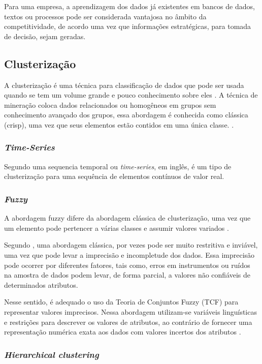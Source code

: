 \documentclass[conference,compsoc]{IEEEtran}
\begin{document}
Para uma empresa, a aprendizagem dos dados já existentes em bancos de dados, textos ou processos pode ser considerada vantajosa no âmbito da competitividade, de acordo \citet{thuraisingham_data_1998} uma vez que informações estratégicas, para tomada de decisão, sejam geradas.

\subsection{Clusterização}
A clusterização é uma técnica para classificação de dados que pode ser usada quando se tem um volume grande e pouco conhecimento sobre eles \cite{reviewcluster}. A técnica de mineração coloca dados relacionados ou homogêneos em grupos sem conhecimento avançado dos grupos, essa abordagem é conhecida como clássica (crisp), uma vez que seus elementos estão contidos em uma única classe. \cite{Rai2010cluster}.

\subsubsection{\textit{Time-Series}}
Segundo \citet{Antunes2001TemporalDM} uma sequencia temporal ou \textit{time-series}, em inglês, é um tipo de clusterização para uma sequência de elementos contínuos de valor real.

\subsubsection{\textit{Fuzzy}}
A abordagem fuzzy difere da abordagem clássica de clusterização, uma vez que um elemento pode pertencer a várias classes e assumir valores variados \cite{fuzzySC2002}.

Segundo \citet{bezdek_tsao_pal}, uma abordagem clássica, por vezes pode ser muito restritiva e inviável, uma vez que pode levar a imprecisão e incompletude dos dados. Essa imprecisão pode ocorrer por diferentes fatores, tais como, erros em instrumentos ou ruídos na amostra de dados podem levar, de forma parcial, a valores não confiáveis de determinados atributos.

Nesse sentido, é adequado o uso da Teoria de Conjuntos Fuzzy (TCF) para representar valores imprecisos. Nessa abordagem utilizam-se variáveis linguísticas e restrições para descrever os valores de atributos, ao contrário de fornecer uma representação numérica exata aos dados com valores incertos dos atributos \cite{fuzzySC2002}.

\subsubsection{\textit{Hierarchical clustering}}
\end{document}
